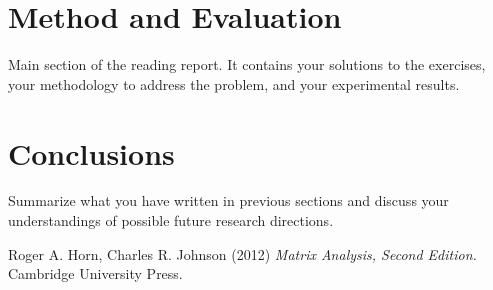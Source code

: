 \documentclass[12pt]{article}
\theoremstyle{definition}
\begin{document}
\section{Method and Evaluation}

Main section of the reading report. It contains your solutions to the exercises, your methodology to address the problem, and your experimental results.

\section{Conclusions}

Summarize what you have written in previous sections and discuss your understandings of possible future research directions.


\vspace{1cm}
\begin{thebibliography}{00}

 Roger A. Horn, Charles R. Johnson (2012) {\em Matrix Analysis, Second Edition.} Cambridge University Press.


\end{thebibliography}
\end{document}
